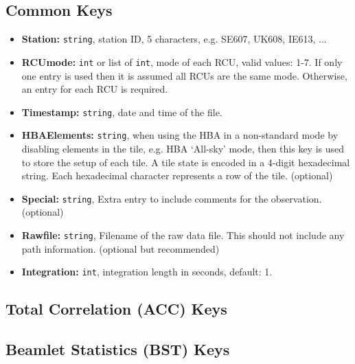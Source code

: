 \documentclass[10pt,a4paper]{article}
\begin{document}
\subsection{Common Keys}
\label{sec:common_keys}

\begin{itemize}
    \item \textbf{Station:} \texttt{string}, station ID, 5 characters, e.g.
    SE607, UK608, IE613, ...
    \item \textbf{RCUmode:} \texttt{int} or list of \texttt{int}, mode of each
    RCU, valid values: 1-7. If only one entry is used then it is assumed all
    RCUs are the same mode. Otherwise, an entry for each RCU is required.
    \item \textbf{Timestamp:} \texttt{string}, date and time of the file.
    \item \textbf{HBAElements:} \texttt{string}, when using the HBA in a
    non-standard mode by disabling elements in the tile, e.g. HBA `All-sky'
    mode, then this key is used to store the setup of each tile. A tile state is
    encoded in a 4-digit hexadecimal string. Each hexadecimal character
    represents a row of the tile. (optional)
    \item \textbf{Special:} \texttt{string}, Extra entry to include comments for
    the observation. (optional)
    \item \textbf{Rawfile:} \texttt{string}, Filename of the raw data file. This
    should not include any path information.
    (optional but recommended)
    \item \textbf{Integration:} \texttt{int}, integration length in seconds,
    default: 1.
\end{itemize}

\subsection{Total Correlation (ACC) Keys}

\subsection{Beamlet Statistics (BST) Keys}
\label{sec:bst_keys}
\end{document}
